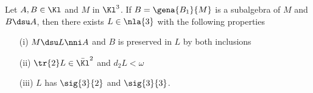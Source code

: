 \begin{lem}
Let $A,B\in\Kl$ and $M$ in $\Kl^{3}$. If $B=\gena{B_{1}}{M}$ is a subalgebra of $M$ and $B\dsu A$, %
then there exists $L\in\nla{3}$ with the following properties
\begin{itemize}
\item[{\rm(i)}]%
$M\dsu L\nni A$ and $B$ is preserved in $L$ by both inclusions
\item[{\rm(ii)}]$\tr{2}L\in\bar{\Kl}^{2}$ and $d_{2}L<\omega$
\item[{\rm(iii)}]$L$ has $\sig{3}{2}$ and $\sig{3}{3}$.
\end{itemize}
\end{lem}

